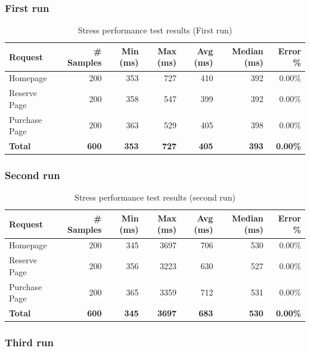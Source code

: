 \documentclass[11pt, leqno, oneside]{article}
\begin{document}
\subsubsection{First run}

\begin{table}[H]
\centering
\small
\begin{tabularx}{\textwidth}{X r r r r r r}
  \hline
  \textbf{Request} & \textbf{\# Samples} & \textbf{Min (ms)} & \textbf{Max (ms)} & \textbf{Avg (ms)} & \textbf{Median (ms)} & \textbf{Error \%} \\
  \hline
  Homepage      & 200 & 353 & 727 & 410 & 392 & 0.00\% \\
  Reserve Page  & 200 & 358 & 547 & 399 & 392 & 0.00\% \\
  Purchase Page & 200 & 363 & 529 & 405 & 398 & 0.00\% \\
  \hline
  \textbf{Total} & \textbf{600} & \textbf{353} & \textbf{727} & \textbf{405} & \textbf{393} & \textbf{0.00\%} \\
  \hline
\end{tabularx}
\caption{Stress performance test results (First run)}
\label{tab:stress}
\end{table}

\subsubsection{Second run}

\begin{table}[H]
\centering
\small
\begin{tabularx}{\textwidth}{X r r r r r r}
  \hline
  \textbf{Request} & \textbf{\# Samples} & \textbf{Min (ms)} & \textbf{Max (ms)} & \textbf{Avg (ms)} & \textbf{Median (ms)} & \textbf{Error \%} \\
  \hline
  Homepage      & 200 & 345 & 3697 & 706 & 530 & 0.00\% \\
  Reserve Page  & 200 & 356 & 3223 & 630 & 527 & 0.00\% \\
  Purchase Page & 200 & 365 & 3359 & 712 & 531 & 0.00\% \\
  \hline
  \textbf{Total} & \textbf{600} & \textbf{345} & \textbf{3697} & \textbf{683} & \textbf{530} & \textbf{0.00\%} \\
  \hline
\end{tabularx}
\caption{Stress performance test results (second run)}
\label{tab:stress2}
\end{table}

\subsubsection{Third run}
\end{document}
